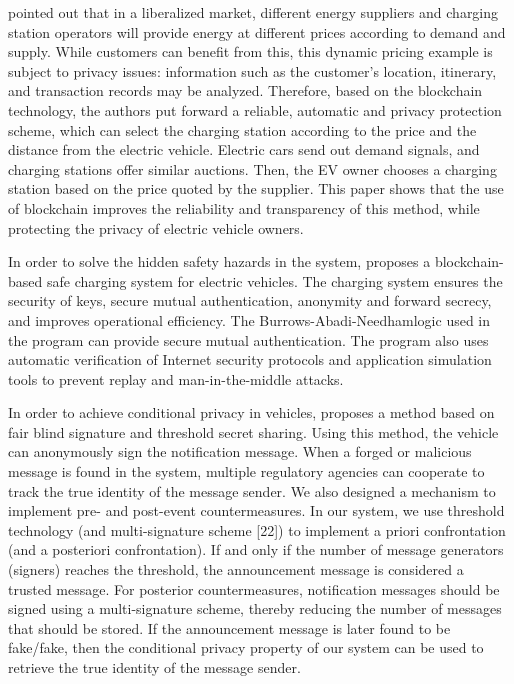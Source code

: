 \cite{ref78} pointed out that in a liberalized market, different energy suppliers and charging station operators will provide energy at different prices according to demand and supply. While customers can benefit from this, this dynamic pricing example is subject to privacy issues: information such as the customer's location, itinerary, and transaction records may be analyzed. Therefore, based on the blockchain technology, the authors put forward a reliable, automatic and privacy protection scheme, which can select the charging station according to the price and the distance from the electric vehicle. Electric cars send out demand signals, and charging stations offer similar auctions. Then, the EV owner chooses a charging station based on the price quoted by the supplier. This paper shows that the use of blockchain improves the reliability and transparency of this method, while protecting the privacy of electric vehicle owners.

In order to solve the hidden safety hazards in the system, \cite{ref79} proposes a blockchain-based safe charging system for electric vehicles. The charging system ensures the security of keys, secure mutual authentication, anonymity and forward secrecy, and improves operational efficiency. The Burrows-Abadi-Needhamlogic used in the program can provide secure mutual authentication. The program also uses automatic verification of Internet security protocols and application simulation tools to prevent replay and man-in-the-middle attacks.

In order to achieve conditional privacy in vehicles, \cite{ref82} proposes a method based on fair blind signature and threshold secret sharing. Using this method, the vehicle can anonymously sign the notification message. When a forged or malicious message is found in the system, multiple regulatory agencies can cooperate to track the true identity of the message sender. We also designed a mechanism to implement pre- and post-event countermeasures. In our system, we use threshold technology (and multi-signature scheme [22]) to implement a priori confrontation (and a posteriori confrontation). If and only if the number of message generators (signers) reaches the threshold, the announcement message is considered a trusted message. For posterior countermeasures, notification messages should be signed using a multi-signature scheme, thereby reducing the number of messages that should be stored. If the announcement message is later found to be fake/fake, then the conditional privacy property of our system can be used to retrieve the true identity of the message sender.
